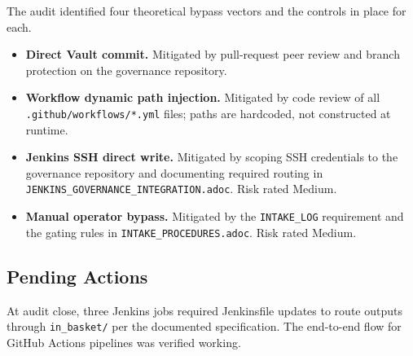 The audit identified four theoretical bypass vectors and the controls in place for each.

\begin{itemize}
  \item \textbf{Direct Vault commit.} Mitigated by pull-request peer review and branch
        protection on the governance repository.
  \item \textbf{Workflow dynamic path injection.} Mitigated by code review of all
        \texttt{.github/workflows/*.yml} files; paths are hardcoded, not constructed at
        runtime.
  \item \textbf{Jenkins SSH direct write.} Mitigated by scoping SSH credentials to the
        governance repository and documenting required routing in
        \texttt{JENKINS\_GOVERNANCE\_INTEGRATION.adoc}. Risk rated Medium.
  \item \textbf{Manual operator bypass.} Mitigated by the \texttt{INTAKE\_LOG} requirement
        and the gating rules in \texttt{INTAKE\_PROCEDURES.adoc}. Risk rated Medium.
\end{itemize}

\subsection{Pending Actions}

At audit close, three Jenkins jobs required Jenkinsfile updates to route outputs through
\texttt{in\_basket/} per the documented specification. The end-to-end flow for GitHub
Actions pipelines was verified working.

